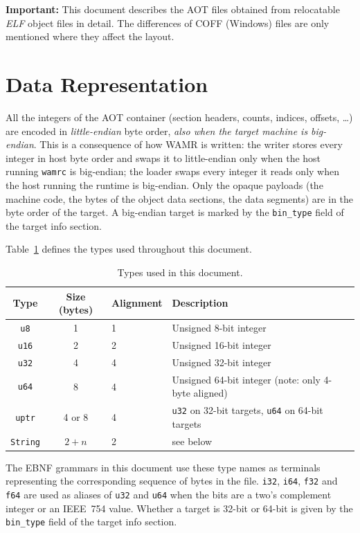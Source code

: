 \documentclass{article}
\begin{document}
\medskip
\textbf{Important:} This document describes the AOT files obtained from relocatable \emph{ELF} object files in detail. The differences of COFF (Windows) files are only mentioned where they affect the layout.

\section{Data Representation}
\label{sec:data-representation}

All the integers of the AOT container (section headers, counts, indices, offsets, \dots) are encoded in \textit{little-endian} byte order, \emph{also when the target machine is big-endian}.
This is a consequence of how WAMR is written: the writer stores every integer in host byte order and swaps it to little-endian only when the host running \texttt{wamrc} is big-endian; the loader swaps every integer it reads only when the host running the runtime is big-endian.
Only the opaque payloads (the machine code, the bytes of the object data sections, the data segments) are in the byte order of the target.
A big-endian target is marked by the \verb|bin_type| field of the target info section.

Table~\ref{table:primitive-types} defines the types used throughout this document.

\begin{table}[H]
\centering
\begin{tabular}{ccll}
    \hline
    Type & Size (bytes) & Alignment & Description \\
    \hline
    \verb|u8|  & 1 & 1 & Unsigned 8-bit integer \\
    \verb|u16| & 2 & 2 & Unsigned 16-bit integer \\
    \verb|u32| & 4 & 4 & Unsigned 32-bit integer \\
    \verb|u64| & 8 & 4 & Unsigned 64-bit integer (note: only 4-byte aligned) \\
    \verb|uptr| & 4 or 8 & 4 & \verb|u32| on 32-bit targets, \verb|u64| on 64-bit targets \\
    \verb|String| & $2+n$ & 2 & see below \\
    \hline
\end{tabular}
\caption{Types used in this document.}
\label{table:primitive-types}
\end{table}

The EBNF grammars in this document use these type names as terminals representing the corresponding sequence of bytes in the file.
\verb|i32|, \verb|i64|, \verb|f32| and \verb|f64| are used as aliases of \verb|u32| and \verb|u64| when the bits are a two's complement integer or an IEEE~754 value.
Whether a target is 32-bit or 64-bit is given by the \verb|bin_type| field of the target info section.
\end{document}
